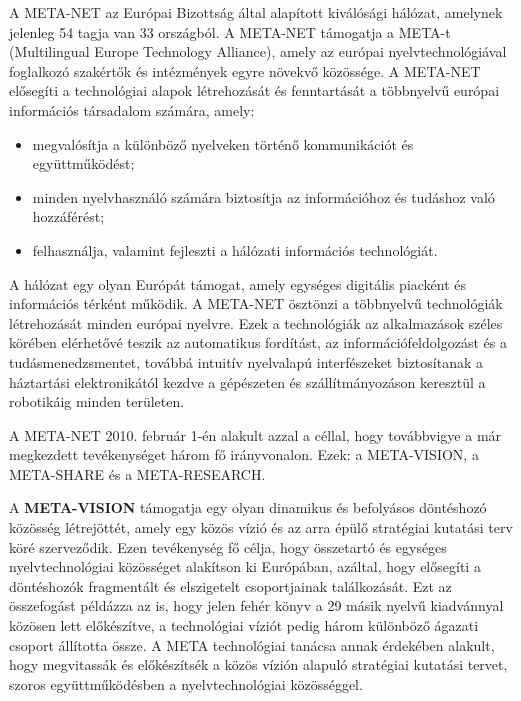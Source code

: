   \begin{multicols}{2}

  A META-NET az Európai Bizottság által alapított kiválósági hálózat, amelynek jelenleg 54 tagja van 33 országból\cite{rehm2011}. A META-NET támogatja a META-t (Multilingual Europe Technology Alliance), amely az európai nyelvtechnológiával foglalkozó szakértők és intézmények egyre növekvő közössége. A META-NET elősegíti a technológiai alapok létrehozását és fenn\-tar\-tá\-sát a többnyelvű európai információs társadalom számára, amely:

  \begin{itemize}
        \item megvalósítja a különböző nyelveken történő kommunikációt és együtt\-mű\-kö\-dést;
        \item minden nyelvhasználó számára biztosítja az információhoz és tudáshoz való hozzáférést;
        \item felhasználja, valamint fejleszti a hálózati információs technológiát.
      \end{itemize}

  A hálózat egy olyan Európát támogat, amely egységes digitális piacként és információs térként működik. A META-NET ösztönzi a többnyelvű technológiák létrehozását minden európai nyelvre. Ezek a technológiák az alkalmazások széles körében elérhetővé teszik az automatikus fordítást, az információfeldolgozást és a tudásmenedzsmentet, továbbá intuitív nyelvalapú interfészeket biztosítanak a háztartási elektronikától kezdve a gépészeten és szállítmányozáson keresztül a robotikáig minden területen. 

  A META-NET 2010. február 1-én alakult azzal a céllal, hogy továbbvigye a már megkezdett tevékenységet három fő irányvonalon. Ezek: a META-VISION, a META-SHARE és a META-RESEARCH. 

  A \textbf{META-VISION} támogatja egy olyan dinamikus és befolyásos döntéshozó kö\-zös\-ség létrejöttét, amely egy közös vízió és az arra épülő stratégiai kutatási terv köré szerveződik. Ezen tevékenység fő célja, hogy összetartó és egységes nyelvtechnológiai közösséget alakítson ki Európában, azáltal, hogy elősegíti a döntéshozók fragmentált és elszigetelt csoportjainak ta\-lál\-ko\-zá\-sát. Ezt az összefogást példázza az is, hogy jelen fehér könyv a 29 másik nyelvű kiadvánnyal közösen lett előkészítve, a technológiai víziót pedig három különböző ágazati csoport állította össze. A META technológiai tanácsa annak érdekében alakult, hogy megvitassák és előkészítsék a közös vízión alapuló stratégiai kutatási tervet, szoros együttműködésben a nyelvtechnológiai közösséggel. 


\end{multicols}

